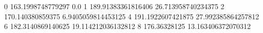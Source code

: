 0 163.1998748779297 0.0
1 189.91383361816406 26.713958740234375
2 170.140380859375 6.9405059814453125
4 191.1922607421875 27.992385864257812
6 182.3140869140625 19.114212036132812
8 176.36328125 13.163406372070312

